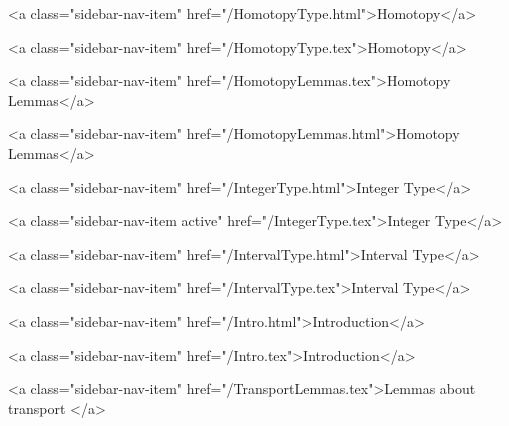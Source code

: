       
        
          <a class="sidebar-nav-item" href="/HomotopyType.html">Homotopy</a>
        
      
    
      
        
          <a class="sidebar-nav-item" href="/HomotopyType.tex">Homotopy</a>
        
      
    
      
        
          <a class="sidebar-nav-item" href="/HomotopyLemmas.tex">Homotopy Lemmas</a>
        
      
    
      
        
          <a class="sidebar-nav-item" href="/HomotopyLemmas.html">Homotopy Lemmas</a>
        
      
    
      
        
          <a class="sidebar-nav-item" href="/IntegerType.html">Integer Type</a>
        
      
    
      
        
          <a class="sidebar-nav-item active" href="/IntegerType.tex">Integer Type</a>
        
      
    
      
        
          <a class="sidebar-nav-item" href="/IntervalType.html">Interval Type</a>
        
      
    
      
        
          <a class="sidebar-nav-item" href="/IntervalType.tex">Interval Type</a>
        
      
    
      
        
          <a class="sidebar-nav-item" href="/Intro.html">Introduction</a>
        
      
    
      
        
          <a class="sidebar-nav-item" href="/Intro.tex">Introduction</a>
        
      
    
      
        
          <a class="sidebar-nav-item" href="/TransportLemmas.tex">Lemmas about transport </a>
        
      
    
